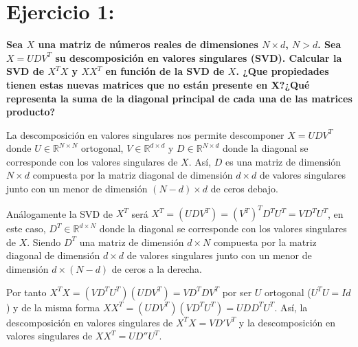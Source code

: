 \documentclass{article}
\begin{document}
\maketitle



\newpage
\tableofcontents
\newpage


\section{Ejercicio 1:}
\textbf{Sea $X$ una matriz de números reales de dimensiones $N \times d$, $N > d$. Sea $X = UDV^T$ su descomposición en valores singulares (SVD). Calcular la SVD  de $X^TX$ y $XX^T$ en función de la SVD de $X$. ¿Que propiedades tienen estas nuevas matrices que no están presente en X?¿Qué representa la suma de la diagonal principal de cada una de las matrices producto?}

	La descomposición en valores singulares nos permite descomponer $X = UDV^T$ donde $U \in \mathbb{R}^{N\times N}$ ortogonal, $V \in \mathbb{R}^{d\times d}$ y $D \in \mathbb{R}^{N \times d}$ donde la diagonal se corresponde con los valores singulares de $X$. Así, $D$ es una matriz de dimensión $N \times d$ compuesta por la matriz diagonal de dimensión $d \times d$ de valores singulares junto con un menor de dimensión $(N-d) \times d$ de ceros debajo.
	
	
	Análogamente la SVD de $X^T$ será $X^T = (UDV^T) = (V^T)^TD^TU^T = VD^TU^T$, en este caso, $D^T \in \mathbb{R}^{d \times N}$ donde la diagonal se corresponde con los valores singulares de $X$. Siendo $D^T$ una matriz de dimensión $d \times N$ compuesta por la matriz diagonal de dimensión $d \times d$ de valores singulares junto con un menor de dimensión $d \times (N - d)$ de ceros a la derecha.
	

	Por tanto $X^TX = (VD^TU^T)(UDV^T) = VD^TDV^T$ por ser $U$ ortogonal ($U^TU = Id$) y de la misma forma $XX^T = (UDV^T)(VD^TU^T) = UDD^TU^T$. Así, la descomposición en valores singulares de $X^TX = VD'V^T$ y la descomposición en valores singulares de $XX^T = UD''U^T$.
	
\end{document}
